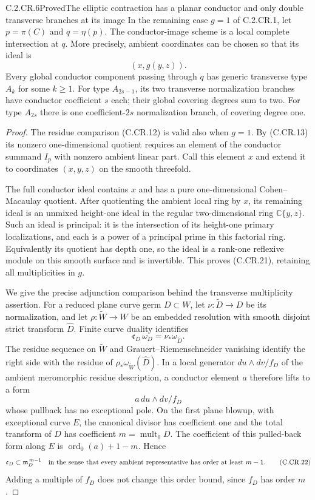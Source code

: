 \begin{statement}{C.2.CR.6}{Proved}{The elliptic contraction has a planar conductor and only double transverse branches at its image}
In the remaining case $g=1$ of C.2.CR.1, let
$p=\pi(C)$ and $q=\eta(p)$. The conductor-image
scheme is a local complete intersection at $q$.
More precisely, ambient coordinates can be chosen
so that its ideal is
\[
                         (x,g(y,z)).               \tag{C.CR.21}
\]
Every global conductor component passing through
$q$ has generic transverse type $A_k$ for some
$k\ge1$. For type $A_{2s-1}$, its two transverse
normalization branches have conductor coefficient
$s$ each; their global covering degrees sum to two.
For type $A_{2s}$ there is one coefficient-$2s$
normalization branch, of covering degree one.
\end{statement}
\begin{proof}
The residue comparison (C.CR.12) is valid also
when $g=1$. By (C.CR.13) its nonzero one-dimensional
quotient requires an element of the conductor
summand $I_p$ with nonzero ambient linear part.
Call this element $x$ and extend it to coordinates
$(x,y,z)$ on the smooth threefold.

The full conductor ideal contains $x$ and has a
pure one-dimensional Cohen--Macaulay quotient.
After quotienting the ambient local ring by $x$,
its remaining ideal is an unmixed height-one
ideal in the regular two-dimensional ring
$\mathbb C\{y,z\}$. Such an ideal is principal:
it is the intersection of its height-one primary
localizations, and each is a power of a principal
prime in this factorial ring. Equivalently its
quotient has depth one, so the ideal is a rank-one
reflexive module on this smooth surface and
is invertible. This proves (C.CR.21), retaining
all multiplicities in $g$.

We give the precise adjunction comparison behind
the transverse multiplicity assertion. For a
reduced plane curve germ $D\subset W$, let
$\nu:\widetilde D\to D$ be its normalization,
and let $\rho:\widetilde W\to W$ be an embedded
resolution with smooth disjoint strict transform
$\widehat D$. Finite curve duality identifies
\[
 \mathfrak c_D\,\omega_D=\nu_*\omega_{\widetilde D}.
\]
The residue sequence on $\widetilde W$ and
Grauert--Riemenschneider vanishing identify the
right side with the residue of
$\rho_*\omega_{\widetilde W}(\widehat D)$.
In a local generator $du\wedge dv/f_D$ of the
ambient meromorphic residue description, a
conductor element $a$ therefore lifts to a form
\[
                     a\,du\wedge dv/f_D
\]
whose pullback has no exceptional pole. On the
first plane blowup, with exceptional curve $E$,
the canonical divisor has coefficient one and
the total transform of $D$ has coefficient
$m=\operatorname{mult}_0 D$. The coefficient
of this pulled-back form along $E$ is
$\operatorname{ord}_0(a)+1-m$. Hence
\[
 \mathfrak c_D\subset\mathfrak m_D^{\,m-1}
 \quad\hbox{in the sense that every ambient
 representative has order at least }m-1.
 \tag{C.CR.22}
\]
Adding a multiple of $f_D$ does not change this
order bound, since $f_D$ has order $m$.


\end{proof}
